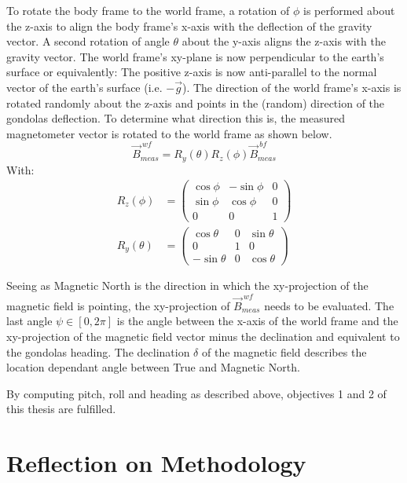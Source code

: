 To rotate the body frame to the world frame, a rotation of $\phi$ is performed about the z-axis to align the body frame's x-axis with the deflection of the gravity vector. A second rotation of angle $\theta$ about the y-axis aligns the z-axis with the gravity vector. The world frame's xy-plane is now perpendicular to the earth's surface or equivalently: The positive z-axis is now anti-parallel to the normal vector of the earth's surface (i.e. $-\vec{g}$). The direction of the world frame's x-axis is rotated randomly about the z-axis and points in the (random) direction of the gondolas deflection. To determine what direction this is, the measured magnetometer vector is rotated to the world frame as shown below.
\begin{equation}
    \vec{B}_{meas}^{\ wf}=R_y(\theta)R_z(\phi)\vec{B}_{meas}^{\ bf}
\end{equation}
With:
\begin{align}
    R_z(\phi)&=\begin{pmatrix}
                \cos\phi & -\sin\phi & 0 \\
                \sin\phi & \cos\phi & 0 \\
                0 & 0 & 1
                \end{pmatrix} \\
    R_y(\theta)&=\begin{pmatrix}
                \cos\theta & 0 & \sin\theta \\
                0 & 1 & 0 \\
                -\sin\theta & 0 & \cos\theta
                \end{pmatrix}
\end{align}

Seeing as Magnetic North is the direction in which the xy-projection of the magnetic field is pointing, the xy-projection of $\vec{B}_{meas}^{\ wf}$ needs to be evaluated. The last angle $\psi\in[0,2\pi]$ is the angle between the x-axis of the world frame and the xy-projection of the magnetic field vector minus the declination and equivalent to the gondolas heading. The declination $\delta$ of the magnetic field describes the location dependant angle between True and Magnetic North.

By computing pitch, roll and heading as described above, objectives 1 and 2 of this thesis are fulfilled.

\section{Reflection on Methodology \label{sec:meth:reflection_methodology}}